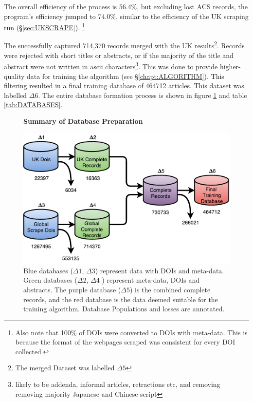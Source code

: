 The overall efficiency of the process is 56.4\%, but excluding lost ACS records, the program's efficiency jumped to 74.0\%, similar to the efficiency of the UK scraping run (\S\ref{sec:UKSCRAPE}). \footnote{Also note that 100\% of DOIs were converted to DOIs with meta-data. This is because the format of the webpages scraped was consistent for every DOI collected.}

The successfully captured 714,370 records merged with the UK results\footnote{The merged Dataset was labelled $\Delta5$}. Records were rejected with short titles or abstracts, or if the majority of the title and abstract were not written in ascii characters\footnote{likely to be addenda, informal articles, retractions etc, and removing removing majority Japanese and Chinese script}. This was done to provide higher-quality data for training the algorithm (see \S\ref{chapt:ALGORITHM}). This filtering resulted in a final training database of 464712 articles. This dataset was labelled $\Delta6$. The entire database formation process is shown in figure \ref{fig:DATABASES} and table \ref{tab:DATABASES}.
\begin{figure}[H]
    \centering
    \textbf{Summary of Database Preparation}\par\medskip
    \includegraphics[scale=0.6]{Data_Acquisition/Databases2.pdf}
    \caption[Summary of Database Preparation]{Blue databases ($\Delta1$, $\Delta3$) represent data with DOIs and meta-data. Green databases ($\Delta2$, $\Delta4$ ) represent meta-data, DOIs and abstracts. The purple database ($\Delta5$) is the combined complete records, and the red database is the data deemed suitable for the training algorithm. Database Populations and losses are annotated.}
     \label{fig:DATABASES}
\end{figure}
